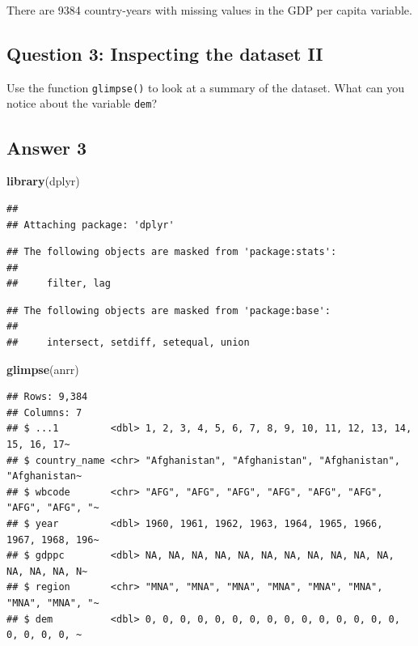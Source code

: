 \documentclass[
  11pt,
  letterpaper]{article}
\newenvironment{Shaded}{\begin{snugshade}}{\end{snugshade}}
\newcommand{\FunctionTok}[1]{\textcolor[rgb]{0.13,0.29,0.53}{\textbf{#1}}}
\newcommand{\NormalTok}[1]{#1}
\begin{document}
There are 9384 country-years with missing values in the GDP per capita
variable.

\subsection{Question 3: Inspecting the dataset
II}\label{question-3-inspecting-the-dataset-ii}

Use the function \texttt{glimpse()} to look at a summary of the dataset.
What can you notice about the variable \texttt{dem}?

\subsection{Answer 3}\label{answer-3}

\begin{Shaded}
\begin{Highlighting}[]
\FunctionTok{library}\NormalTok{(dplyr)}
\end{Highlighting}
\end{Shaded}

\begin{verbatim}
## 
## Attaching package: 'dplyr'
\end{verbatim}

\begin{verbatim}
## The following objects are masked from 'package:stats':
## 
##     filter, lag
\end{verbatim}

\begin{verbatim}
## The following objects are masked from 'package:base':
## 
##     intersect, setdiff, setequal, union
\end{verbatim}

\begin{Shaded}
\begin{Highlighting}[]
\FunctionTok{glimpse}\NormalTok{(anrr)}
\end{Highlighting}
\end{Shaded}

\begin{verbatim}
## Rows: 9,384
## Columns: 7
## $ ...1         <dbl> 1, 2, 3, 4, 5, 6, 7, 8, 9, 10, 11, 12, 13, 14, 15, 16, 17~
## $ country_name <chr> "Afghanistan", "Afghanistan", "Afghanistan", "Afghanistan~
## $ wbcode       <chr> "AFG", "AFG", "AFG", "AFG", "AFG", "AFG", "AFG", "AFG", "~
## $ year         <dbl> 1960, 1961, 1962, 1963, 1964, 1965, 1966, 1967, 1968, 196~
## $ gdppc        <dbl> NA, NA, NA, NA, NA, NA, NA, NA, NA, NA, NA, NA, NA, NA, N~
## $ region       <chr> "MNA", "MNA", "MNA", "MNA", "MNA", "MNA", "MNA", "MNA", "~
## $ dem          <dbl> 0, 0, 0, 0, 0, 0, 0, 0, 0, 0, 0, 0, 0, 0, 0, 0, 0, 0, 0, ~
\end{verbatim}
\end{document}

